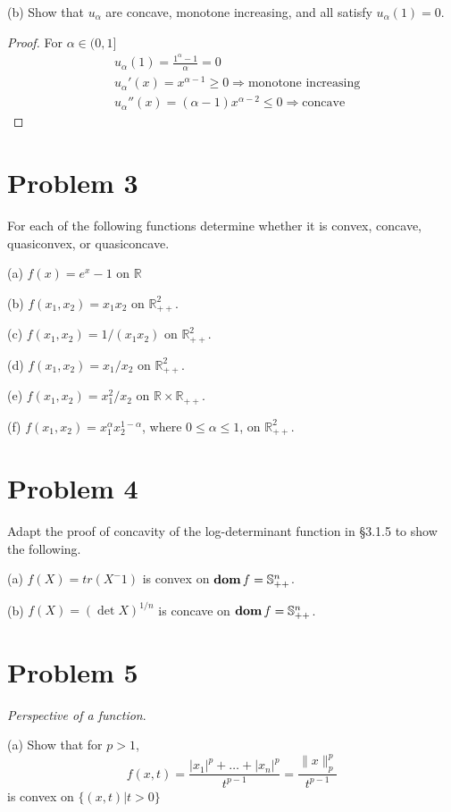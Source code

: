 \documentclass[11pt]{article}
\newcommand{\RR}{\mathbb{R}}
\newcommand{\bS}{\mathbb{S}}
\begin{document}
(b) Show that $u_\alpha$ are concave, monotone increasing, and all satisfy $u_\alpha(1) = 0$.

\begin{proof}
  For $\alpha\in(0, 1]$
  \begin{align*}
    &u_\alpha(1) = \frac{1^\alpha - 1}{\alpha} = 0\\
    &u_\alpha'(x) = x^{\alpha-1}\geq0 \Rightarrow\text{monotone increasing}\\
    &u_\alpha''(x) = (\alpha-1)x^{\alpha-2} \leq 0 \Rightarrow\text{concave}
  \end{align*}
\end{proof}

\clearpage
\section*{Problem 3}
For each of the following functions determine whether it is convex, concave, quasiconvex, or quasiconcave.

(a) $f(x)=e^x-1$ on $\RR$

(b) $f\left(x_1, x_2\right)=x_1 x_2$ on $\RR_{++}^2$.

(c) $f\left(x_1, x_2\right)=1 /\left(x_1 x_2\right)$ on $\RR_{++}^2$.

(d) $f\left(x_1, x_2\right)=x_1 / x_2$ on $\RR_{++}^2$.

(e) $f\left(x_1, x_2\right)=x_1^2 / x_2$ on $\RR \times \RR_{++}$.

(f) $f\left(x_1, x_2\right)=x_1^\alpha x_2^{1-\alpha}$, where $0 \leq \alpha \leq 1$, on $\RR_{++}^2$.

\clearpage
\section*{Problem 4}
Adapt the proof of concavity of the log-determinant function in §3.1.5 to show the following.

(a) $f(X) = tr(X^-1)$ is convex on $\dom f = \bS^n_{++}$.

(b) $f(X) = (\det X)^{1/n}$ is concave on $\dom f = \bS^n_{++}$.


\clearpage
\section*{Problem 5}
\textit{Perspective of a function}.

(a) Show that for $p>1$,
\[
f(x, t) = \frac{|x_1|^p + \dots + |x_n|^p}{t^{p-1}} = \frac{\|x\|^p_p}{t^{p-1}}
\]
is convex on $\{(x, t)|t>0\}$
\end{document}
